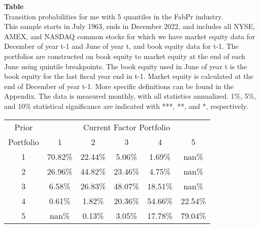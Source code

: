 \begin{table*}[ht!]
\raggedright
{}
\label{tab: transition_probs_me_FabPr_with_5_quantiles}
\textbf{Table \thetable} \\
Transition probabilities for me with 5 quantiles in the FabPr industry. \\
\hspace*{1em}This sample starts in July 1963, ends in December 2022, and includes all NYSE, AMEX, and NASDAQ common stocks for which we have market equity data for December of year t-1 and June of year t, and book equity data for t-1. The portfolios are constructed on book equity to market equity at the end of each June using quintile breakpoints.  The book equity used in June of year t is the book equity for the last fiscal year end in t-1.  Market equity is calculated at the end of December of year t-1.  More specific definitions can be found in the Appendix.  The data is measured monthly, with all statistics annualized.  1\%, 5\%, and 10\% statistical significance are indicated with ***, **, and *, respectively. \\
\vspace{0.5em}
\centering
\begin{adjustbox}{max width=\textwidth}
\begin{tabular}{@{}cccccc@{}}
\toprule
Prior & \multicolumn{5}{c}{Current Factor Portfolio} \\
Portfolio & 1 & 2 & 3 & 4 & 5 \\
\midrule
1 & 70.82\% & 22.44\% & 5.06\% & 1.69\% & nan\% \\
2 & 26.96\% & 44.82\% & 23.46\% & 4.75\% & nan\% \\
3 & 6.58\% & 26.83\% & 48.07\% & 18.51\% & nan\% \\
4 & 0.61\% & 1.82\% & 20.36\% & 54.66\% & 22.54\% \\
5 & nan\% & 0.13\% & 3.05\% & 17.78\% & 79.04\% \\
\bottomrule
\end{tabular}
\end{adjustbox}
\end{table*}